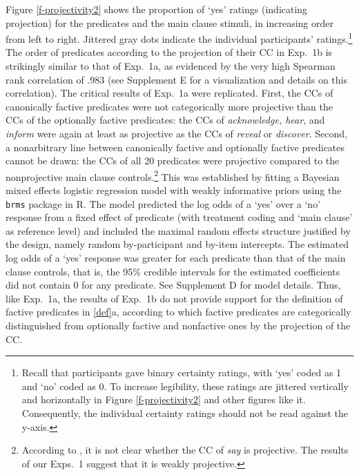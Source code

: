 \documentclass{language}
\newcommand{\6}{\mbox{$[\hspace*{-.6mm}[$}}
\newcommand{\9}{\mbox{$]\hspace*{-.6mm}]$}}
\begin{document}
Figure \ref{f-projectivity2} shows the proportion of `yes' ratings (indicating projection) for the predicates and the main clause stimuli, in increasing order from left to right. Jittered gray dots indicate the individual participants' ratings.\footnote{Recall that participants gave binary certainty ratings, with `yes' coded as 1 and `no' coded as 0. To increase legibility, these ratings are jittered vertically and horizontally in Figure \ref{f-projectivity2} and other figures like it. Consequently, the individual certainty ratings should not be read against the y-axis.} The order of predicates according to the projection of their CC in Exp.~1b is strikingly similar to that of Exp.~1a, as evidenced by the very high Spearman rank correlation of .983 (see Supplement E for a visualization and details on this correlation). The critical results of Exp.~1a were replicated. First, the CCs of canonically factive predicates were not categorically more projective than the CCs of the optionally factive predicates:  the CCs of {\em acknowledge, hear}, and {\em inform} were again at least as projective as the CCs of {\em reveal} or {\em discover}. Second, a nonarbitrary line between canonically factive and optionally factive predicates cannot be drawn: the CCs of all 20 predicates were projective compared to the nonprojective main clause controls.\footnote{According to \citealt[1739]{spector-egre2015}, it is not clear whether the CC of {\em say} is projective. The results of our Exps.~1 suggest that it is weakly projective.}  This was established by fitting a Bayesian mixed effects logistic regression model  with weakly informative priors using the \verb|brms| package in R. The model predicted the log odds of a `yes' over a `no' response from a fixed effect of predicate (with treatment coding and `main clause' as  reference level) and included the maximal random effects structure justified by the design, namely random by-participant and by-item intercepts. The estimated log odds of a `yes' response was greater for each predicate than that of the main clause controls, that is, the 95\% credible intervals for the estimated coefficients did not contain 0 for any predicate. See Supplement D for model details. Thus, like Exp.~1a, the results of Exp.~1b do not provide support for the definition of factive predicates in \ref{def}a, according to which factive predicates are categorically distinguished from optionally factive and nonfactive ones by the projection of the CC.
\end{document}
